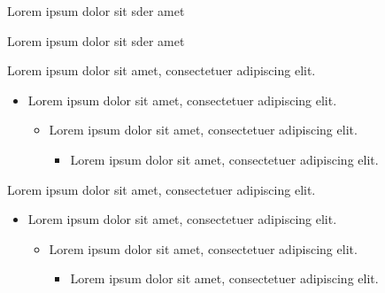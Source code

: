 \documentclass[11pt, aspectratio=169]{beamer}
\begin{document}
\begin{frame}[t]{\secname}{
    \begin{minipage}[t]{0.47\textwidth}
        Lorem ipsum dolor sit sder amet
    \end{minipage}
    \hfill
    \begin{minipage}[t]{0.43\textwidth}
        Lorem ipsum dolor sit sder amet
    \end{minipage}
    }

    \begin{minipage}[t]{0.47\textwidth}
        Lorem ipsum dolor sit amet, consectetuer adipiscing elit.
        \begin{itemize}
            \item Lorem ipsum dolor sit amet, consectetuer adipiscing elit.
            \begin{itemize}
                \item Lorem ipsum dolor sit amet, consectetuer adipiscing elit.
                \begin{itemize}
                    \item Lorem ipsum dolor sit amet, consectetuer adipiscing elit.
                \end{itemize}
            \end{itemize}
        \end{itemize}
    \end{minipage}
    \hfill
    \begin{minipage}[t]{0.47\textwidth}
        Lorem ipsum dolor sit amet, consectetuer adipiscing elit.
        \begin{itemize}
            \item Lorem ipsum dolor sit amet, consectetuer adipiscing elit.
            \begin{itemize}
                \item Lorem ipsum dolor sit amet, consectetuer adipiscing elit.
                \begin{itemize}
                    \item Lorem ipsum dolor sit amet, consectetuer adipiscing elit.
                \end{itemize}
            \end{itemize}
        \end{itemize}
    \end{minipage}
\end{frame}

\begin{frame}
\end{frame}
\end{document}
